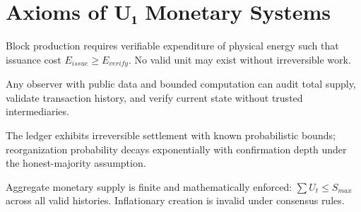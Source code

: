 \section{Axioms of U₁ Monetary Systems}

\begin{axiom}
Block production requires verifiable expenditure of physical energy such that issuance cost $E_{issue} \ge E_{verify}$. No valid unit may exist without irreversible work.
\end{axiom}

\begin{axiom}
Any observer with public data and bounded computation can audit total supply, validate transaction history, and verify current state without trusted intermediaries.
\end{axiom}

\begin{axiom}
The ledger exhibits irreversible settlement with known probabilistic bounds; reorganization probability decays exponentially with confirmation depth under the honest-majority assumption.
\end{axiom}

\begin{axiom}
Aggregate monetary supply is finite and mathematically enforced:
$\sum U_t \le S_{max}$ across all valid histories. Inflationary creation is invalid under consensus rules.
\end{axiom}